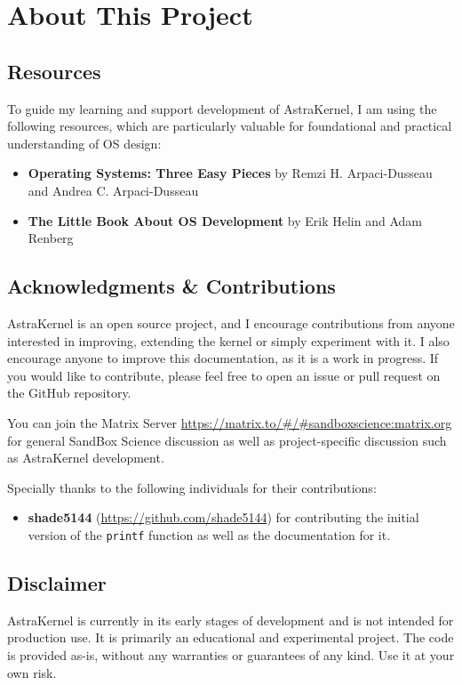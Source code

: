 \section*{About This Project}
\subsection*{Resources}

To guide my learning and support development of AstraKernel, I am using the following resources, 
which are particularly valuable for foundational and practical understanding of OS design:
\begin{itemize}
  \item \textbf{Operating Systems: Three Easy Pieces} by Remzi H. Arpaci-Dusseau and Andrea C. Arpaci-Dusseau
  \item \textbf{The Little Book About OS Development} by Erik Helin and Adam Renberg
\end{itemize}

\subsection*{Acknowledgments \& Contributions}

AstraKernel is an open source project, and I encourage contributions from anyone 
interested in improving, extending the kernel or simply experiment with it. I also 
encourage anyone to improve this documentation, as it is a work in progress.
If you would like to contribute, please feel free to open an issue or pull request on the GitHub repository.
\begin{info}
  You can join the Matrix Server \url{https://matrix.to/#/#sandboxscience:matrix.org} 
  for general SandBox Science discussion as well as project-specific discussion such 
  as AstraKernel development.
\end{info}

\noindent
Specially thanks to the following individuals for their contributions:
\begin{itemize}
  \item \textbf{shade5144} (\url{https://github.com/shade5144}) for contributing the initial version of the \texttt{printf} 
  function as well as the documentation for it.
\end{itemize}

\subsection*{Disclaimer}

AstraKernel is currently in its early stages of development and is not intended for production use. 
It is primarily an educational and experimental project. The code is provided as-is, 
without any warranties or guarantees of any kind. Use it at your own risk.
